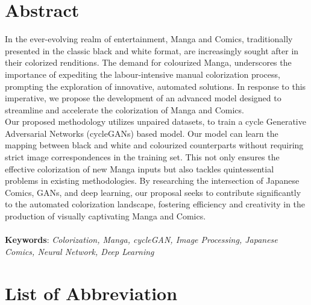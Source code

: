 \large
\chapter*{Abstract}
\normalsize
{}
In the ever-evolving realm of entertainment, Manga and Comics, traditionally presented in the classic black and white format, are increasingly sought after in their colorized renditions. The demand for colourized Manga, underscores the importance of expediting the labour-intensive manual colorization process, prompting the exploration of innovative, automated solutions. In response to this imperative, we propose the development of an advanced model designed to streamline and accelerate the colorization of Manga and Comics.\\

\noindent Our proposed methodology utilizes unpaired datasets, to train a cycle Generative Adversarial Networks (cycleGANs) based model. Our model can learn the mapping between black and white and colourized counterparts without requiring strict image correspondences in the training set. This not only ensures the effective colorization of new Manga inputs but also tackles quintessential problems in existing methodologies. By researching the intersection of Japanese Comics, GANs, and deep learning, our proposal seeks to contribute significantly to the automated colorization landscape, fostering efficiency and creativity in the production of visually captivating Manga and Comics. \\\\

\noindent \textbf{Keywords}: \textit{Colorization, Manga, cycleGAN, Image Processing, Japanese Comics, Neural Network, Deep Learning}
\pagebreak

\tableofcontents
{}


\listoffigures
{}
\pagebreak

\listoftables
{}
\pagebreak

\Large
\begingroup
\let\clearpage\relax
\chapter*{List of Abbreviation}
\endgroup
\normalsize
{}

